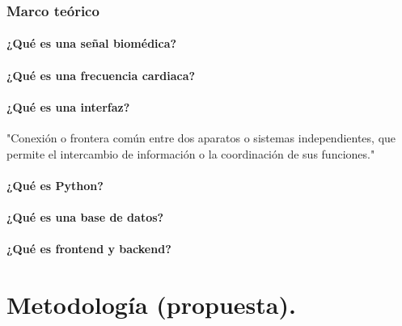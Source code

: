 \documentclass[14pt]{report}
\begin{document}
		\subsubsection{Marco teórico}
		\paragraph{¿Qué es una señal biomédica?}
		\paragraph{¿Qué es una frecuencia cardiaca?}
		\paragraph{¿Qué es una interfaz?} "Conexión o frontera común entre dos aparatos o sistemas independientes, que permite el intercambio de información o la coordinación de sus funciones." \cite{rae_interfaz}
		\paragraph{¿Qué es Python?}
		\paragraph{¿Qué es una base de datos?}
		\paragraph{¿Qué es frontend y backend?}
		
	\section{Metodología (propuesta).}
	\printbibliography
\begin{abstract}
\end{abstract}
\end{document}
